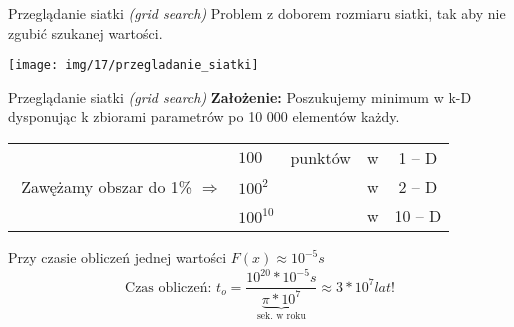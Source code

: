   \begin{frame}{Przeglądanie siatki \emph{(grid search)}}
    Problem z doborem rozmiaru siatki, tak aby nie zgubić szukanej wartości.

    \texttt{[image: img/17/przegladanie\_siatki]}
  \end{frame}

  \begin{frame}{Przeglądanie siatki \emph{(grid search)}}
    \textbf{Założenie:} Poszukujemy minimum w k-D dysponując k zbiorami parametrów po 10 000 elementów każdy.

    \begin{tabular}{@{} c l c c c @{}}
      & $ 100 $ & punktów & w & 1 -- D \\
      $ $ Zawężamy obszar do 1\% $ \Rightarrow $ & $ 100^{2} $ & & w & 2 -- D \\
      & $ 100^{10} $ & & w & 10 -- D \\
    \end{tabular}

    Przy czasie obliczeń jednej wartości $F(x) \approx 10^{-5}s$
    \begin{displaymath}
      \text{Czas obliczeń: } t_o = \frac{10^{20}*10^{-5}s}{\underbrace{\pi * 10^{7}}_{\text{sek. w roku}}} \approx 3 * 10^{7}lat \text{!}
    \end{displaymath}
    \begin{flushright}
    \end{flushright}
  \end{frame}

